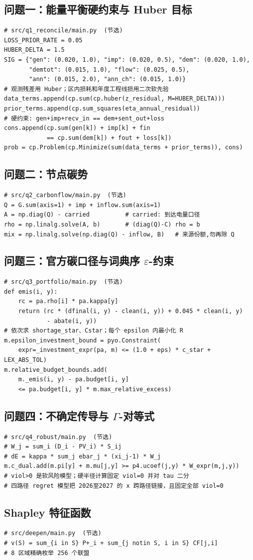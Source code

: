\documentclass[UTF8,a4paper,zihao=-4,fontset=fandol]{ctexart}
\begin{document}
\subsection{问题一：能量平衡硬约束与 Huber 目标}
\begin{lstlisting}
# src/q1_reconcile/main.py  (节选)
LOSS_PRIOR_RATE = 0.05
HUBER_DELTA = 1.5
SIG = {"gen": (0.020, 1.0), "imp": (0.020, 0.5), "dem": (0.020, 1.0),
       "demtot": (0.015, 1.0), "flow": (0.025, 0.5),
       "ann": (0.015, 2.0), "ann_ch": (0.015, 1.0)}
# 观测残差用 Huber；区内损耗和年度工程线损用二次软先验
data_terms.append(cp.sum(cp.huber(z_residual, M=HUBER_DELTA)))
prior_terms.append(cp.sum_squares(eta_annual_residual))
# 硬约束: gen+imp+recv_in == dem+sent_out+loss
cons.append(cp.sum(gen[k]) + imp[k] + fin
            == cp.sum(dem[k]) + fout + loss[k])
prob = cp.Problem(cp.Minimize(sum(data_terms + prior_terms)), cons)
\end{lstlisting}

\subsection{问题二：节点碳势}
\begin{lstlisting}
# src/q2_carbonflow/main.py  (节选)
Q = G.sum(axis=1) + imp + inflow.sum(axis=1)
A = np.diag(Q) - carried          # carried: 到达电量口径
rho = np.linalg.solve(A, b)       # (diag(Q)-C) rho = b
mix = np.linalg.solve(np.diag(Q) - inflow, B)   # 来源份额,勿再除 Q
\end{lstlisting}

\subsection{\texorpdfstring{问题三：官方碳口径与词典序 $\varepsilon$-约束}{问题三：官方碳口径与词典序 ε-约束}}
\begin{lstlisting}
# src/q3_portfolio/main.py  (节选)
def emis(i, y):
    rc = pa.rho[i] * pa.kappa[y]
    return (rc * (dfinal(i, y) - clean(i, y)) + 0.045 * clean(i, y)
            - abate(i, y))
# 依次求 shortage_star、Cstar；每个 epsilon 内最小化 R
m.epsilon_investment_bound = pyo.Constraint(
    expr=_investment_expr(pa, m) <= (1.0 + eps) * c_star + LEX_ABS_TOL)
m.relative_budget_bounds.add(
    m._emis(i, y) - pa.budget[i, y]
    <= pa.budget[i, y] * m.max_relative_excess)
\end{lstlisting}

\subsection{\texorpdfstring{问题四：不确定传导与 $\Gamma$-对等式}{问题四：不确定传导与鲁棒对等式}}
\begin{lstlisting}
# src/q4_robust/main.py  (节选)
# W_j = sum_i (D_i - PV_i) * S_ij
# dE = kappa * sum_j ebar_j * (xi_j-1) * W_j
m.c_dual.add(m.pi[y] + m.mu[j,y] >= p4.ucoef(j,y) * W_expr(m,j,y))
# viol>0 是软风险模型；硬半径计算固定 viol=0 并对 tau 二分
# 四路径 regret 模型把 2026至2027 的 x 跨路径链接，且固定全部 viol=0
\end{lstlisting}

\subsection{Shapley 特征函数}
\begin{lstlisting}
# src/deepen/main.py  (节选)
# v(S) = sum_{i in S} P+_i + sum_{j notin S, i in S} CF[j,i]
# 8 区域精确枚举 256 个联盟
\end{lstlisting}
\end{document}
